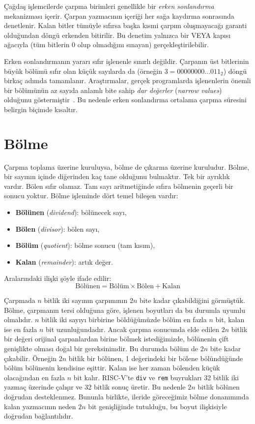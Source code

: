 Çağdaş işlemcilerde çarpma birimleri genellikle bir \emph{erken sonlandırma} mekanizması içerir. Çarpan yazmacının içeriği her sağa kaydırma sonrasında denetlenir. Kalan bitler tümüyle sıfırsa başka kısmi çarpım oluşmayacağı garanti olduğundan döngü erkenden bitirilir. Bu denetim yalnızca bir VEYA kapısı ağacıyla (tüm bitlerin 0 olup olmadığını sınayan) gerçekleştirilebilir.

Erken sonlandırmanın yararı sıfır işlenenle sınırlı değildir. Çarpanın üst bitlerinin büyük bölümü sıfır olan küçük sayılarda da (örneğin $3 = 00000000\ldots011_2$) döngü birkaç adımda tamamlanır. Araştırmalar, gerçek programlarda işlenenlerin önemli bir bölümünün az sayıda anlamlı bite sahip \emph{dar değerler} (\emph{narrow values}) olduğunu göstermiştir~\cite{ergin2004}. Bu nedenle erken sonlandırma ortalama çarpma süresini belirgin biçimde kısaltır.


\section{Bölme}
\label{sec:bolme}

Çarpma toplama üzerine kuruluysa, bölme de çıkarma üzerine kuruludur. Bölme, bir sayının içinde diğerinden kaç tane olduğunu bulmaktır. Tek bir ayrıklık vardır. Bölen sıfır olamaz. Tam sayı aritmetiğinde sıfıra bölmenin geçerli bir sonucu yoktur. Bölme işleminde dört temel bileşen vardır:
%
\begin{itemize}
\item \textbf{Bölünen} (\emph{dividend}): bölünecek sayı,
\item \textbf{Bölen} (\emph{divisor}): bölen sayı,
\item \textbf{Bölüm} (\emph{quotient}): bölme sonucu (tam kısım),
\item \textbf{Kalan} (\emph{remainder}): artık değer.
\end{itemize}

Aralarındaki ilişki şöyle ifade edilir:
\[
\text{Bölünen} = \text{Bölüm} \times \text{Bölen} + \text{Kalan}
\]

Çarpmada $n$ bitlik iki sayının çarpımının $2n$ bite kadar çıkabildiğini görmüştük. Bölme, çarpmanın tersi olduğuna göre, işlenen boyutları da bu durumla uyumlu olmalıdır. $n$ bitlik iki sayıyı birbirine böldüğümüzde bölüm en fazla $n$ bit, kalan ise en fazla $n$ bit uzunluğundadır. Ancak çarpma sonucunda elde edilen $2n$ bitlik bir değeri orijinal çarpanlardan birine bölmek istediğimizde, bölünenin çift genişlikte olması doğal bir gereksinimdir. Bu durumda bölüm de $2n$ bite kadar çıkabilir. Örneğin $2n$ bitlik bir bölünen, 1 değerindeki bir bölene bölündüğünde bölüm bölünenin kendisine eşittir. Kalan ise her zaman bölenden küçük olacağından en fazla $n$ bit kalır. RISC-V'te \texttt{div} ve \texttt{rem} buyrukları 32 bitlik iki yazmaç üzerinde çalışır ve 32 bitlik sonuç üretir. Bu nedenle $2n$ bitlik bölünen doğrudan desteklenmez. Bununla birlikte, ileride göreceğimiz bölme donanımında kalan yazmacının neden $2n$ bit genişliğinde tutulduğu, bu boyut ilişkisiyle doğrudan bağlantılıdır.

